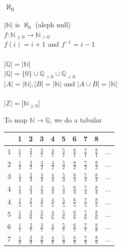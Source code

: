 \documentclass[12pt,a4paper]{article}
\begin{document}
\subsubsection{$\aleph_0$}
$|\mathbb{N}|$ is $\aleph_0$ (aleph null)\\
$f: \mathbb{N}_{\geq 0} \rightarrow \mathbb{N}_{>0}$\\
$f(i) = i + 1$ and $f^{-1} = i-1$
\\
\\
$|\mathbb{Q}| = |\mathbb{N}|$\\
$|\mathbb{Q}| = \{0\} \cup \mathbb{Q}_{>0} \cup \mathbb{Q}_{<0}$\\
$|A| = |\mathbb{N}|, |B| = |\mathbb{N}|$ and $|A \cup B| = |\mathbb{N}|$
\\
\\
$|\mathbb{Z}| = |\mathbb{N}_{\geq 0}|$
\begin{center}
\end{center}
To map $\mathbb{N} \rightarrow \mathbb{Q}$, we do a tabular
\begin{tabular}{c|ccccccccc}
&1&2&3&4&5&6&7&8\\
\hline
1&$\frac{1}{1}$&$\frac{2}{1}$&$\frac{3}{1}$&$\frac{4}{1}$&$\frac{5}{1}$&$\frac{6}{1}$&$\frac{7}{1}$&$\frac{8}{1}$&...\\
2&$\frac{1}{2}$&$\frac{2}{2}$&$\frac{3}{2}$&$\frac{4}{2}$&$\frac{5}{2}$&$\frac{6}{2}$&$\frac{7}{2}$&$\frac{8}{2}$&...\\
3&$\frac{1}{3}$&$\frac{2}{3}$&$\frac{3}{3}$&$\frac{4}{3}$&$\frac{5}{3}$&$\frac{6}{3}$&$\frac{7}{3}$&$\frac{8}{3}$&...\\
4&$\frac{1}{4}$&$\frac{2}{4}$&$\frac{3}{4}$&$\frac{4}{4}$&$\frac{5}{4}$&$\frac{6}{4}$&$\frac{7}{4}$&$\frac{8}{4}$&...\\
4&$\frac{1}{5}$&$\frac{2}{5}$&$\frac{3}{5}$&$\frac{4}{5}$&$\frac{5}{5}$&$\frac{6}{5}$&$\frac{7}{5}$&$\frac{8}{5}$&...\\
5&$\frac{1}{6}$&$\frac{2}{6}$&$\frac{3}{6}$&$\frac{4}{6}$&$\frac{5}{6}$&$\frac{6}{6}$&$\frac{7}{6}$&$\frac{8}{6}$&...\\
6&$\frac{1}{7}$&$\frac{2}{7}$&$\frac{3}{7}$&$\frac{4}{7}$&$\frac{5}{7}$&$\frac{6}{7}$&$\frac{7}{7}$&$\frac{8}{8}$&...\\
7&$\frac{1}{9}$&$\frac{2}{9}$&$\frac{3}{9}$&$\frac{4}{9}$&$\frac{5}{9}$&$\frac{6}{9}$&$\frac{7}{9}$&$\frac{8}{9}$&...\\
\end{tabular}
\end{document}
